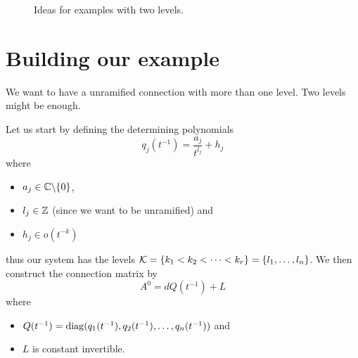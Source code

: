 \begin{figure}[!htbp]
\begin{subfigure}[b]{0.33\textwidth}
  \end{subfigure}
  \caption{Ideas for examples with two levels.}
\end{figure} %

\section{Building our example}
We want to have a unramified connection with more than one level. Two levels
might be enough.

Let us start by defining the determining polynomials
\[
  q_j(t^{-1})=\frac{a_j}{t^{l_j}}+h_j
\]
where
\begin{itemize}
  \item $a_j\in\mathbb{C}\backslash\{0\}$,
  \item $l_j\in\mathbb{Z}$ (since we want to be unramified) and
  \item $h_j\in o(t^{-k})$ 
\end{itemize}
thus our system has the levels $\mathcal{K}=\{k_1<k_2<\cdots<k_r\}=\{l_1,\dots,l_n\}$.
We then construct the connection matrix by
\[
  A^0=dQ(t^{-1})+L
\]
where
\begin{itemize}
  \item $Q(t^{-1})=\operatorname{diag}(q_1(t^{-1}),q_2(t^{-1}),\dots,q_n(t^{-1}))$
    and
  \item $L$ is constant invertible.
\end{itemize}

